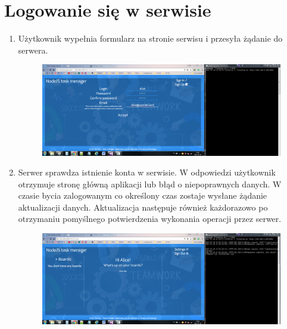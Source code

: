 \documentclass[12pt]{report}
\begin{document}
\section{Logowanie się w serwisie}
\begin{enumerate}
\item Użytkownik wypełnia formularz na stronie serwisu i przesyła żądanie do serwera.
\begin{figure}[h]
\centering
\includegraphics[width=\textwidth,height=\textheight,keepaspectratio]{41.png}
\end{figure}
\item Serwer sprawdza istnienie konta w serwisie. 
W odpowiedzi użytkownik otrzymuje stronę główną aplikacji lub błąd o niepoprawnych danych.
W czasie bycia zalogowanym co określony czas zostaje wysłane żądanie aktualizacji danych. 
Aktualizacja następuje również każdorazowo po otrzymaniu pomyślnego potwierdzenia wykonania operacji przez serwer.
\begin{figure}[h]
\centering
\includegraphics[width=\textwidth,height=\textheight,keepaspectratio]{42.png}
\end{figure}
\end{enumerate}
\end{document}
